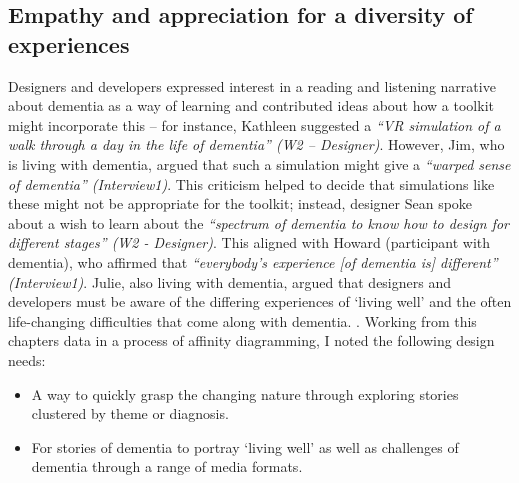 \subsection{Empathy and appreciation for a diversity of experiences}
Designers and developers expressed interest in a reading and listening narrative about dementia as a way of learning and contributed ideas about how a toolkit might incorporate this – for instance, Kathleen suggested a \textit{``VR simulation of a walk through a day in the life of dementia'' (W2 – Designer)}. However, Jim, who is living with dementia, argued that such a simulation might give a \textit{``warped sense of dementia'' (Interview1)}. This criticism helped to decide that simulations like these might not be appropriate for the toolkit; instead, designer Sean spoke about a wish to learn about the \textit{``spectrum of dementia to know how to design for different stages'' (W2 - Designer)}. This aligned with Howard (participant with dementia), who affirmed that \textit{``everybody’s experience [of dementia is] different'' (Interview1)}.  Julie, also living with dementia, argued that designers and developers must be aware of the differing experiences of `living well' and the often life-changing difficulties that come along with dementia. . Working from this chapters data in a process of affinity diagramming, I noted the following design needs:
\begin{itemize}
    \item A way to quickly grasp the changing nature through exploring stories clustered by theme or diagnosis.
    \item For stories of dementia to portray `living well' as well as challenges of dementia through a range of media formats.
\end{itemize}

